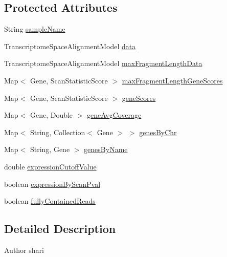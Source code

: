 \subsection*{Protected Attributes}
\begin{DoxyCompactItemize}
\item 
String \hyperlink{classbroad_1_1pda_1_1seq_1_1clip_1_1_sample_data_a7c4644dba1de73c9baf1743c65628617}{sample\+Name}
\item 
Transcriptome\+Space\+Alignment\+Model \hyperlink{classbroad_1_1pda_1_1seq_1_1clip_1_1_sample_data_aaa5b43deb7143f3c845893faab23e33e}{data}
\item 
Transcriptome\+Space\+Alignment\+Model \hyperlink{classbroad_1_1pda_1_1seq_1_1clip_1_1_sample_data_ae74526f9f7081cb45a51ac714bdb788e}{max\+Fragment\+Length\+Data}
\item 
Map$<$ Gene, Scan\+Statistic\+Score $>$ \hyperlink{classbroad_1_1pda_1_1seq_1_1clip_1_1_sample_data_ab16a8cd9c6087c8086bdc63e4daae69d}{max\+Fragment\+Length\+Gene\+Scores}
\item 
Map$<$ Gene, Scan\+Statistic\+Score $>$ \hyperlink{classbroad_1_1pda_1_1seq_1_1clip_1_1_sample_data_a38dff572a12928939c8cefc3ad77b624}{gene\+Scores}
\item 
Map$<$ Gene, Double $>$ \hyperlink{classbroad_1_1pda_1_1seq_1_1clip_1_1_sample_data_af41165298cda748416235bdaeef7ecf5}{gene\+Avg\+Coverage}
\item 
Map$<$ String, Collection$<$ Gene $>$ $>$ \hyperlink{classbroad_1_1pda_1_1seq_1_1clip_1_1_sample_data_a8cd7634b21c85e6a4e79e65083932b28}{genes\+By\+Chr}
\item 
Map$<$ String, Gene $>$ \hyperlink{classbroad_1_1pda_1_1seq_1_1clip_1_1_sample_data_ab1ed0ab3b3ab3a672ba6fec27eb0905e}{genes\+By\+Name}
\item 
double \hyperlink{classbroad_1_1pda_1_1seq_1_1clip_1_1_sample_data_ad60c5254db251c508821fe4d85563c6c}{expression\+Cutoff\+Value}
\item 
boolean \hyperlink{classbroad_1_1pda_1_1seq_1_1clip_1_1_sample_data_a728846c6f5131cd3a7b4acdcb682c4fa}{expression\+By\+Scan\+Pval}
\item 
boolean \hyperlink{classbroad_1_1pda_1_1seq_1_1clip_1_1_sample_data_a9688cfb05381c9fbf875f8b329c89f9a}{fully\+Contained\+Reads}
\end{DoxyCompactItemize}


\subsection{Detailed Description}
\begin{DoxyAuthor}{Author}
shari 
\end{DoxyAuthor}


